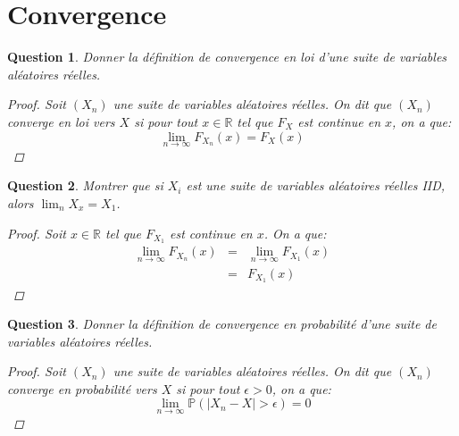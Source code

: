 \documentclass{article}
\theoremstyle{plain}
\newtheorem{question}{Question}
\theoremstyle{definition}
\begin{document}
\section{Convergence}

\begin{question}
	Donner la définition de convergence en loi d'une suite de variables aléatoires réelles.
	\begin{proof}
		Soit $(X_n)$ une suite de variables aléatoires réelles. On dit que $(X_n)$ converge en loi vers $X$ si pour tout $x \in \mathbb{R}$ tel que $F_X$ est continue en $x$, on a que:
		\begin{equation*}
			\lim_{n \to \infty} F_{X_n} (x) = F_X (x)
		\end{equation*}
	\end{proof}

\end{question}

\begin{question}
	Montrer que si $X_i$ est une suite de variables aléatoires réelles IID, alors $\lim_n X_x = X_1$.
	\begin{proof}
		Soit $x \in \mathbb{R}$ tel que $F_{X_1}$ est continue en $x$. On a que:
		\begin{eqnarray*}
			\lim_{n \to \infty} F_{X_n} (x) &=& \lim_{n \to \infty} F_{X_1} (x) \\
			&=& F_{X_1} (x)
		\end{eqnarray*}
	\end{proof}
\end{question}


\begin{question}
	Donner la définition de convergence en probabilité d'une suite de variables aléatoires réelles.
	\begin{proof}
		Soit $(X_n)$ une suite de variables aléatoires réelles. On dit que $(X_n)$ converge en probabilité vers $X$ si pour tout $\epsilon > 0$, on a que:
		\begin{equation*}
			\lim_{n \to \infty} \mathbb{P} (|X_n - X| > \epsilon) = 0
		\end{equation*}
	\end{proof}
\end{question}
\end{document}
